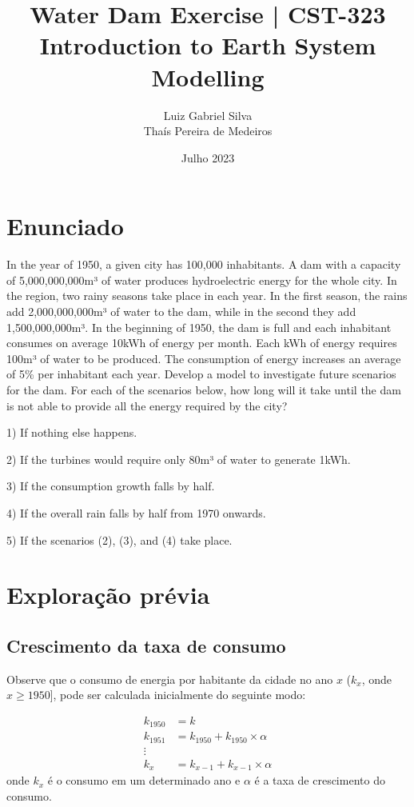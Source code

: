\documentclass{article}
\title{\textbf{Water Dam Exercise} | 
CST-323 Introduction to Earth System Modelling}
\author{Luiz Gabriel Silva \\ Thaís Pereira de Medeiros}
\date{Julho 2023}
\begin{document}
\onehalfspacing
\maketitle

\section{Enunciado}

In the year of 1950, a given city has 100,000 inhabitants. A dam with a capacity of 5,000,000,000m³ of water produces hydroelectric energy for the whole city. In the region, two rainy seasons take place in each year. In the first season, the rains add 2,000,000,000m³ of water to the dam, while in the second they add 1,500,000,000m³. In the beginning of 1950, the dam is full and each inhabitant consumes on average 10kWh of energy per month. Each kWh of energy requires 100m³ of water to be produced. The consumption of energy increases an average of 5\% per inhabitant each year. Develop a model to investigate future scenarios for the dam. For each of the scenarios below, how long will it take until the dam is not able to provide all the energy required by the city?

1) If nothing else happens.

2) If the turbines would require only 80m³ of water to generate 1kWh.

3) If the consumption growth falls by half.

4) If the overall rain falls by half from 1970 onwards.

5) If the scenarios (2), (3), and (4) take place.

\section{Exploração prévia}

\subsection{Crescimento da taxa de consumo}

Observe que o consumo de energia por habitante da cidade no ano $x$ ($k_x$, onde $x \geq 1950$], pode ser calculada inicialmente do seguinte modo:

\begin{align*}
    k_{1950} &= k \\
    k_{1951} &= k_{1950} + k_{1950} \times \alpha \\
    \vdots \\
    k_{x} &= k_{x - 1} + k_{x - 1} \times \alpha
\end{align*}
onde $k_x$ é o consumo em um determinado ano e $\alpha$ é a taxa de crescimento do consumo.
\end{document}
